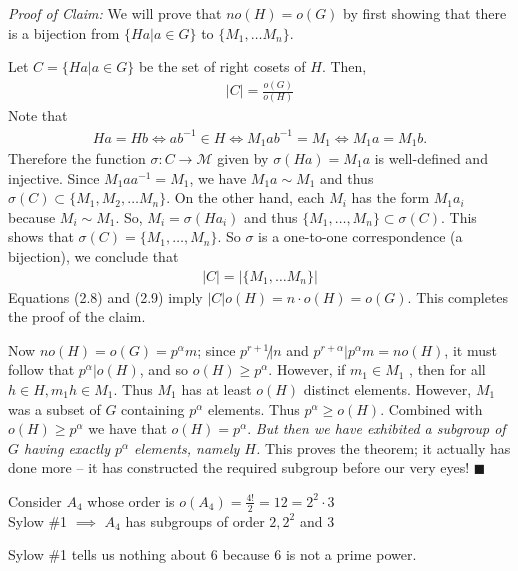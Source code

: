 \begin{theorem}
\noindent \textit{Proof of Claim:}
We will prove that $no(H)=o(G)$ by first showing that there is a bijection from $\{Ha | a \in G\}$
to $\{M_1,\dots M_n\}$. \steezybreak

\noindent Let $C= \{Ha|a\in G\}$ be the set of right cosets of $H$. Then,
\begin{align}
    |C| = \frac{o(G)}{o(H)}
\end{align}
Note that
\begin{align}
    Ha=Hb \iff ab^{-1} \in H \iff M_1 ab^{-1} = M_1 \iff M_1a=M_1b .\nonumber
\end{align}
Therefore the function $\sigma:C\rightarrow \mathcal{M}$ given by $\sigma(Ha)=M_1 a$ is well-defined
and injective. Since $M_1aa^{-1}=M_1$, we have $M_1a\sim M_1$ and thus
$\sigma(C) \subset \{M_1,M_2,\dots M_n\}$. On the other hand, each $M_i$ has the form $M_1a_i$
because $M_i \sim M_1$. So, $M_i = \sigma(Ha_i)$ and thus $\{M_1, \dots, M_n\} \subset \sigma(C)$.
This shows that $\sigma(C)= \{M_1, \dots , M_n\}$. So $\sigma$ is a one-to-one correspondence (a
bijection), we conclude that
\begin{align}
    |C|=|\{M_1,\dots M_n\}|
\end{align}
Equations (2.8) and (2.9) imply $|C|o(H)=n\cdot o(H)=o(G)$. This completes the proof of the claim.

Now $no(H) = o(G) = p^\alpha m$; since $p^{r+1}\not | n$ and $p^{r+\alpha}|p^{\alpha}m = no(H)$, it
must follow that $p^\alpha | o(H)$, and so $o(H)\geq p^\alpha$. However, if $m_1 \in M_1$ , then for
all $h\in H, m_1h \in M_1$. Thus $M_1$ has at least $o(H)$ distinct elements. However, $M_1$ was a
subset of $G$ containing $p^\alpha$ elements. Thus $p^\alpha \geq o(H)$. Combined with
$o(H) \geq p^\alpha$ we have that $o(H) = p^\alpha$. \textit{But then we have exhibited a subgroup
of $G$ having exactly $p^\alpha$ elements, namely $H$.} This proves the theorem; it actually has
done more -- it has constructed the required subgroup before our very eyes! $\blacksquare$

\end{theorem}

\begin{example}
Consider $A_4$ whose order is $o(A_4)= \frac{4!}{2} = 12 =2^2\cdot 3$ \\
\noindent Sylow \#1 $\implies$ $A_4$ has subgroups of order $2,2^2$ and $3$ \steezybreak

\noindent Sylow \#1 tells us nothing about $6$ because $6$ is not a prime power.
\end{example}

